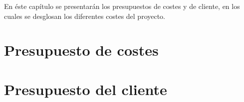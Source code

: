 En éste capítulo se presentarán los presupuestos de costes y de cliente, en los cuales se desglosan los diferentes costes del proyecto.

\section{Presupuesto de costes}
\label{presupuesto:costes}


\section{Presupuesto del cliente}
\label{presupuesto:cliente}
